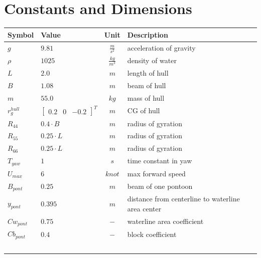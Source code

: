 \documentclass[12pt,a4]{article}
\begin{document}
\section{Constants and Dimensions}

\begin{table}[H]
	\centering
	\begin{tabular}{l|lcl}
		Symbol       & Value                           & Unit             & Description                                       \\\hline
		$g$          & $9.81$                          & $\frac{m}{s^2}$  & acceleration of gravity                           \\
		$\rho$       & $1025$                          & $\frac{kg}{m^3}$ & density of water                                  \\
		$L$          & $ 2.0 $                         & $m$              & length of hull                                    \\
		$B$          & $ 1.08 $                        & $m$              & beam of hull                                      \\
		$m$          & $ 55.0 $                        & $ kg $           & mass of hull                                      \\\hline
		$r_g^{hull}$ & $ \begin{bmatrix}0.2&0&-0.2\end{bmatrix}^T $ & $ m$             & CG of hull                                        \\
		$R_{44} $    & $0.4 \cdot B$                   & $m$              & radius of gyration                                \\
		$R_{55} $    & $0.25\cdot L$                   & $m$              & radius of gyration                                \\
		$R_{66} $    & $0.25\cdot L$                   & $m$              & radius of gyration                                \\
		$T_{yaw}$    & $ 1$                            & $s $             & time constant in yaw                              \\
		$U_{max}$    & $ 6 $                           & $ knot $         & max forward speed                                 \\\hline
		$B_{pont} $  & $0.25 $                         & $ m $            & beam of one pontoon                               \\
		$y_{pont} $  & $0.395$                         & $ m $            & distance from centerline to waterline area center \\
		$Cw_{pont}$  & $0.75 $                         & $ - $            & waterline area coefficient                        \\
		$Cb_{pont}$  & $0.4$                           & $ - $            & block coefficient                                 \\
		$ $          & $ $                             & $  $             &                                                   \\
	\end{tabular}
\end{table}
\end{document}
